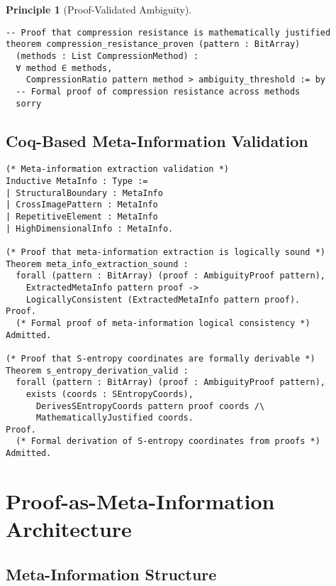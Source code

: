 \documentclass[12pt,a4paper]{article}
\theoremstyle{definition}
\newtheorem{principle}{Principle}
\begin{document}
\begin{principle}[Proof-Validated Ambiguity]
\begin{lstlisting}[language=Lean, caption=Lean Proof Structure for Compression Validation]
-- Proof that compression resistance is mathematically justified
theorem compression_resistance_proven (pattern : BitArray) 
  (methods : List CompressionMethod) : 
  ∀ method ∈ methods, 
    CompressionRatio pattern method > ambiguity_threshold := by
  -- Formal proof of compression resistance across methods
  sorry
\end{lstlisting}

\subsection{Coq-Based Meta-Information Validation}

\begin{lstlisting}[language=Coq, caption=Coq Formalization of Meta-Information Proofs]
(* Meta-information extraction validation *)
Inductive MetaInfo : Type :=
| StructuralBoundary : MetaInfo
| CrossImagePattern : MetaInfo  
| RepetitiveElement : MetaInfo
| HighDimensionalInfo : MetaInfo.

(* Proof that meta-information extraction is logically sound *)
Theorem meta_info_extraction_sound : 
  forall (pattern : BitArray) (proof : AmbiguityProof pattern),
    ExtractedMetaInfo pattern proof -> 
    LogicallyConsistent (ExtractedMetaInfo pattern proof).
Proof.
  (* Formal proof of meta-information logical consistency *)
Admitted.

(* Proof that S-entropy coordinates are formally derivable *)
Theorem s_entropy_derivation_valid :
  forall (pattern : BitArray) (proof : AmbiguityProof pattern),
    exists (coords : SEntropyCoords),
      DerivesSEntropyCoords pattern proof coords /\
      MathematicallyJustified coords.
Proof.
  (* Formal derivation of S-entropy coordinates from proofs *)
Admitted.
\end{lstlisting}

\section{Proof-as-Meta-Information Architecture}

\subsection{Meta-Information Structure}


\end{principle}
\end{document}

